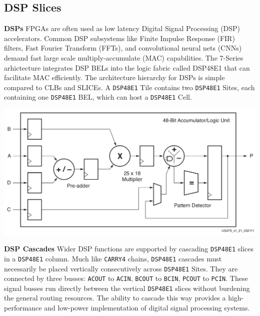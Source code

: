 \begin{multicols}{2}

\subsection{DSP Slices}

\textbf{DSPs} \quad 
FPGAs are often used as low latency Digital Signal Processing (DSP) accelerators. 
Common DSP subsystems like Finite Impulse Response (FIR) filters, Fast Fourier Transform (FFTs), and convolutional neural nets (CNNs) demand fast large scale multiply-accumulate (MAC) capabilities. 
The 7-Series arhictecture integrates DSP BELs into the logic fabric called DSP48E1 that can facilitate MAC efficiently. 
The architecture hierarchy for DSPs is simple compared to CLBs and SLICEs. 
A \texttt{DSP48E1} Tile contains two \texttt{DSP48E1} Sites, each containing one \texttt{DSP48E1} BEL, which can host a \texttt{DSP48E1} Cell. 

{
    \centering
    \includegraphics[width=\columnwidth]{figures/dsp_diagram.png}
    \label{dsp_diagram}
}
\vspace{0.5cm}

\textbf{DSP Cascades} \quad 
Wider DSP functions are supported by cascading \texttt{DSP48E1} slices in a \texttt{DSP48E1} column.
Much like \texttt{CARRY4} chains, \texttt{DSP48E1} cascades must necessarily be placed vertically consecutively across \texttt{DSP48E1} Sites. 
They are connected by three busses: \texttt{ACOUT} to \texttt{ACIN}, \texttt{BCOUT} to \texttt{BCIN}, \texttt{PCOUT} to \texttt{PCIN}.
These signal busses run directly between the vertical \texttt{DSP48E1} slices without burdening the general routing resources. 
The ability to cascade this way provides a high-performance and low-power implementation of digital signal processing systems. 


\end{multicols}
